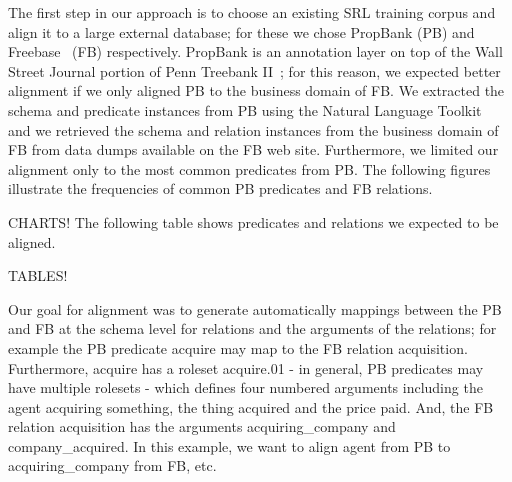 The first step in our approach is to choose an existing SRL training corpus and align it to a large external database; for these we chose PropBank (PB) and Freebase~\cite{bollacker_freebase:_2008} (FB) respectively.
PropBank is an annotation layer on top of the Wall Street Journal portion of Penn Treebank II~\cite{marcus_building_1993}; for this reason, we expected better alignment if we only aligned PB to the business domain of FB.
We extracted the schema and predicate instances from PB using the Natural Language Toolkit~\cite{bird_nltk:_2006} and we retrieved the schema and relation instances from the business domain of FB from data dumps available on the FB web site.
Furthermore, we limited our alignment only to the most common predicates from PB.  The following figures illustrate the frequencies of common PB predicates and FB relations.

CHARTS! 
The following table shows predicates and relations we expected to be aligned.

TABLES!

Our goal for alignment was to generate automatically mappings between the PB and FB at the schema level for relations and the arguments of the relations; for example the PB predicate acquire may map to the FB relation acquisition.
Furthermore, acquire has a roleset acquire.01 - in general, PB predicates may have multiple rolesets - which defines four numbered arguments including the agent acquiring something, the thing acquired and the price paid.
And, the FB relation acquisition has the arguments acquiring\_company and company\_acquired.
In this example, we want to align agent from PB to acquiring\_company from FB, etc. 

